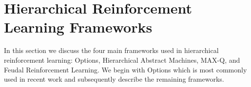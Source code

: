 \section{Hierarchical Reinforcement Learning Frameworks}
In this section we discuss the four main frameworks used in hierarchical
reinforcement learning: Options, Hierarchical Abstract Machines,
MAX-Q, and Feudal Reinforcement Learning. We begin with Options
which is most commonly used in recent work and subsequently describe the
remaining frameworks.

